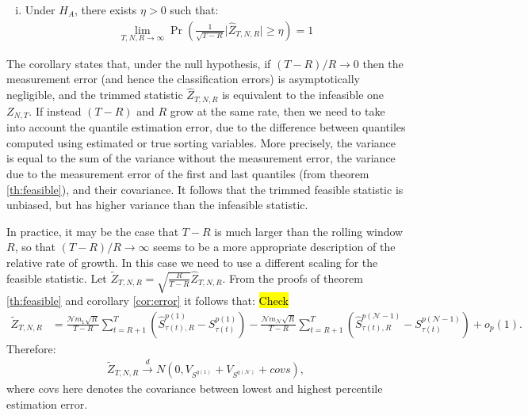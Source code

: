 \begin{corollary}
\begin{enumerate}[(i)]
\item Under $H_A$, there exists $\eta > 0$ such that:
\begin{align*}
 	\lim_{T,N,R \rightarrow \infty } \Pr \left( \frac{1}{\sqrt{T-R}} \lvert \widehat{Z}_{T,N,R} \rvert \geq \eta \right) = 1
\end{align*}
\end{enumerate}
\end{corollary}

\noindent
The corollary states that, under the null hypothesis, if $\left( T-R\right)/R \rightarrow 0$ then the measurement error (and hence the classification errors) is asymptotically negligible, and the trimmed statistic $\widehat{Z}_{T,N,R}$ is equivalent to the infeasible one $Z_{N,T}$. If instead $\left( T-R\right)$ and $R$ grow at the same rate, then we need to take into account the quantile estimation error, due to the difference between quantiles computed using estimated or true sorting variables. More precisely, the variance is equal to the sum of the variance without the measurement error, the variance due to the measurement error of the first and last quantiles (from theorem \ref{th:feasible}), and their covariance. It follows that the trimmed feasible statistic is unbiased, but has higher variance than the infeasible statistic.

In practice, it may be the case that $T-R$ is much larger than the rolling window $R$, so that $(T-R)/R\rightarrow \infty$ seems to be a more appropriate description of the relative rate of growth. In this case we need to use a different scaling for the feasible statistic. Let $\widetilde{Z}_{T,N,R} = \sqrt{\frac{R}{T-R}} \widehat{Z}_{T,N,R}$. From the proofs of theorem \ref{th:feasible} and corollary \ref{cor:error} it follows that: \hl{Check}
\begin{align*}
	\widetilde{Z}_{T,N,R} &= \frac{\mathcal{N} m_{1} \sqrt{R}}{T-R} \sum_{t=R+1}^{T} \left( \widehat{S}_{\tau(t),R}^{p(1)}-S_{\tau(t) }^{p(1)}\right) -\frac{\mathcal{N} m_{\mathcal{N}} \sqrt{R}}{T-R}\sum_{t=R+1}^{T} \left(\widehat{S}_{\tau(t),R}^{p(\mathcal{N}-1)}-S_{\tau(t) }^{p(\mathcal{N}-1)}\right) +o_{p}(1).
\end{align*}
Therefore: 
\begin{align*}
	\widetilde{Z}_{T,N,R}\overset{d}{\rightarrow }N\left(0, V_{S^{q(1)}}+V_{S^{q(\mathcal{N})}}+ covs\right), 
\end{align*}
where \textrm{covs} here denotes the covariance between lowest and highest percentile estimation error. 


